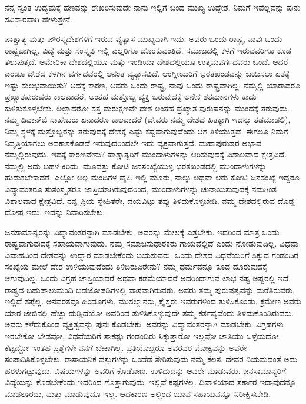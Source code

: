 ನನ್ನ ಸ್ವಂತ ಉದ್ಯಮಕ್ಕೆ ಹಣವನ್ನು ಶೇಖರಿಸುವುದೇ ನಾನು ಇಲ್ಲಿಗೆ ಬಂದ ಮುಖ್ಯ ಉದ್ದೇಶ. ನಿಮಗೆ ಇವೆಲ್ಲವನ್ನು ಪುನಃ ಸವಿಸ್ತಾರವಾಗಿ ಹೇಳುತ್ತೇನೆ.

ಪಾಶ್ಚಾತ್ಯ ಮತ್ತು ಪೌರಸ್ತ್ಯದೇಶಗಳಿಗೆ ಇರುವ ವ್ಯತ್ಯಾಸ ಮುಖ್ಯವಾಗಿ ಇದು. ಅವರು ಒಂದು ರಾಷ್ಟ್ರ, ನಾವು ಒಂದು ರಾಷ್ಟ್ರವಾಗಿಲ್ಲ. ವಿದ್ಯೆ ಮತ್ತು ಸಂಸ್ಕೃತಿ ಇಲ್ಲಿ ಎಲ್ಲರಿಗೂ ದೊರಕುವಂತಿದೆ. ಸಮಾಜದಲ್ಲಿ ಕೆಳಗೆ ಇರುವವರಿಗೂ ಕೂಡ ತಲುಪುತ್ತದೆ. ಅಮೇರಿಕಾ ದೇಶದಲ್ಲಿಯೂ ಮತ್ತು ಇಂಡಿಯಾ ದೇಶದಲ್ಲಿಯೂ ಉತ್ತಮವರ್ಗದವರು ಒಂದೆ. ಆದರೆ ಎರಡೂ ದೇಶದ ಕೆಳಗಿನ ವರ್ಗದವರಲ್ಲಿ ಅನಂತ ವ್ಯತ್ಯಾಸವಿದೆ. ಆಂಗ್ಲೀಯರಿಗೆ ಭರತಖಂಡವನ್ನು ಜಯಿಸಲು ಏತಕ್ಕೆ ಇಷ್ಟು ಸುಲಭವಾಯಿತು? ಅದಕ್ಕೆ ಕಾರಣ, ಅವರು ಒಂದು ರಾಷ್ಟ್ರ, ನಾವು ಒಂದು ರಾಷ್ಟ್ರವಾಗಿಲ್ಲ. ನಮ್ಮಲ್ಲಿ ಯಾರಾದರೂ ಪ್ರಖ್ಯಾತಪುರುಷರು ಕಾಲವಾದರೆ, ಅಂತಹ ಮತ್ತೊಬ್ಬ ವ್ಯಕ್ತಿ ಬರುವುದಕ್ಕೆ ಅನೇಕ ಶತಮಾನಗಳು ಕಾದು ಕುಳಿತುಕೊಳ್ಳಬೇಕು. ಅಲ್ಲಾದರೋ ಸತ್ತ ಮರುಕ್ಷಣವೇ ದೇಶ ಅಂತಹ ಪ್ರಖ್ಯಾತ ಪುರುಷನನ್ನು ಮುಂದಕ್ಕೆ ತರುವುದು. ನಮ್ಮ ದಿವಾನ್‌ಜಿ ಸಾಹೇಬರು ಏನಾದರೂ ಕಾಲವಾದರೆ (ದೇವರು ನಮ್ಮ ದೇಶದ ಹಿತಕ್ಕಾಗಿ ಇದನ್ನು ತಡಮಾಡಲಿ), ನಿಮ್ಮ ಸ್ಥಳಕ್ಕೆ ಮತ್ತೊಬ್ಬರನ್ನು ತರುವುದಕ್ಕೆ ದೇಶಕ್ಕೆ ಎಷ್ಟು ಕಷ್ಟವಾಗುವುದೆಂದು ಆಗ ತಿಳಿಯುತ್ತದೆ. ಈಗಲೂ ನಿಮಗೆ ನಿವೃತ್ತಿಯಾಗಲು ಅವಕಾಶಕೊಡದೆ ಇರುವುದರಿಂದಲೇ ಇದು ವ್ಯಕ್ತವಾಗುತ್ತದೆ. ಮಹಾಪುರುಷರ ಅಭಾವ ನಮ್ಮಲ್ಲಿರುವುದು. ಇದಕ್ಕೆ ಕಾರಣವೇನು? ಪಾಶ್ಚಾತ್ಯರಿಗೆ ಮುಂದಾಳುಗಳನ್ನು ಆರಿಸುವುದಕ್ಕೆ ವಿಶಾಲವಾದ ಕ್ಷೇತ್ರವಿದೆ. ನಮ್ಮಲ್ಲಿ ಅದು ಬಹಳ ಕಿರಿದು. ಮೂವತ್ತು ಕೋಟಿ ಜನಸಂಖ್ಯೆಯುಳ್ಳ ಭರತಖಂಡದಲ್ಲಿ ಮುಂದಾಳುಗಳನ್ನು ಹುಡುಕಬೇಕಾದರೆ, ಎಲ್ಲೋ ಅಲ್ಪ ಮಂದಿಗಳ ಪೈಕಿ. ಇಲ್ಲಿ ಮೂರು, ನಾಲ್ಕು ಅಥವಾ ಆರು ಕೋಟಿ ಜನಸಂಖ್ಯೆ ಇದ್ದರೂ ವಿದ್ಯಾವಂತರೂ ಸುಸಂಸ್ಕೃತರೂ ಜಾಸ್ತಿಯಾಗಿರುವುದರಿಂದ, ಮುಂದಾಳುಗಳನ್ನು ಚುನಾಯಿಸುವುದಕ್ಕೆ ನಮಗಿಂತ ವಿಶಾಲವಾದ ಕ್ಷೇತ್ರವಿದೆ. ನನ್ನ ಪ್ರಿಯ ಸ್ನೇಹಿತರೇ, ದಯವಿಟ್ಟು ತಪ್ಪು ತಿಳಿದುಕೊಳ್ಳಬೇಡಿ. ನಮ್ಮ ದೇಶದಲ್ಲಿರುವ ದೊಡ್ಡ ದೋಷ ಇದು. ಇದನ್ನು ನಿವಾರಿಸಬೇಕು.

ಜನಸಾಮಾನ್ಯರನ್ನು ವಿದ್ಯಾವಂತರನ್ನಾಗಿ ಮಾಡಬೇಕು. ಅವರನ್ನು ಮೇಲಕ್ಕೆ ಎತ್ತಬೇಕು. ಇದರಿಂದ ಮಾತ್ರ ಒಂದು ರಾಷ್ಟ್ರವಾಗುವುದಕ್ಕೆ ಸಹಾಯವಾಗುವುದು. ನಮ್ಮ ಸಮಾಜಸುಧಾರಕರು ಗಾಯವೆಲ್ಲಿದೆ ಎಂದು ನೋಡುವುದಿಲ್ಲ. ವಿಧವಾ ವಿವಾಹದಿಂದ ದೇಶವನ್ನು ಉದ್ದಾರ ಮಾಡಬೇಕೆಂದು ಬಯಸುವರು. ಒಂದು ದೇಶದ ವಿಧವೆಯರಿಗೆ ಸಿಕ್ಕುವ ಗಂಡಂದಿರ ಸಂಖ್ಯೆಯ ಮೇಲೆ ದೇಶ ಉಳಿಯುವುದೆಂದು ತಿಳಿದಿರುವಿರೇನು? ನಮ್ಮ ಧರ್ಮವನ್ನೂ ಕೂಡ ದೂರುವುದಕ್ಕೆ ಆಗುವುದಿಲ್ಲ. ಒಂದು ವಿಗ್ರಹ ಜಾಸ್ತಿಯಾದರೆ ಅಥವಾ ಕಡಮೆಯಾದರೆ ಅದರಿಂದಾಗುವ ಲಾಭ ನಷ್ಟ ಅಷ್ಟರಲ್ಲಿ ಇದೆ. ರಾಷ್ಟ್ರದ ಬಹುಪಾಲುಮಂದಿ ಬಡಜೋಪಡಿಗಳಲ್ಲಿ ವಾಸವಾಗಿರುವರು. ಅವರು ತಮ್ಮ ಪುರುಷತ್ವವನ್ನು ಮರೆತಿರುವರು. ಇಲ್ಲಿದೆ ತಪ್ಪೆಲ್ಲ. ಅನವರತವೂ ಹಿಂದೂಗಳು, ಮುಸಲ್ಮಾನರು, ಕ್ರೈಸ್ತರು ಇವರುಗಳಿಂದ ತುಳಿಸಿಕೊಂಡು, ಕ್ರಮೇಣ ಅವರು ಯಾರ ಜೇಬಿನಲ್ಲಿ ಹೆಚ್ಚು ದುಡ್ಡಿದೆಯೋ ಅವರಿಂದ ತುಳಿಸಿಕೊಳ್ಳುವುದೇ ತಮ್ಮ ಕರ್ತವ್ಯವೆಂದು ತಿಳಿದುಕೊಂಡಿರುವರು. ಅವರು ಕಳೆದುಕೊಂಡ ವ್ಯಕ್ತಿತ್ವವನ್ನು ಪುನಃ ಕೊಡಬೇಕು. ಅವರನ್ನು ವಿದ್ಯಾವಂತರನ್ನಾಗಿ ಮಾಡಬೇಕು. ವಿಗ್ರಹಗಳು ಇರಬೇಕೋ ಬೇಡವೋ, ವಿಧವೆಯರಿಗೆ ಸಾಕಷ್ಟು ಗಂಡಂದಿರು ಸಿಕ್ಕುತ್ತಾರೋ ಇಲ್ಲವೋ ಜಾತಿಯು ಒಳ್ಳೆಯದೋ ಕೆಟ್ಟದ್ದೋ ಇಂತಹ ಪ್ರಶ್ನೆಗಳೇ ನನಗೆ ಬೇಕಾಗಿಲ್ಲ. ಪ್ರತಿಯೊಬ್ಬರೂ ಅವರವರ ಮೋಕ್ಷವನ್ನು ಅವರೇ ಸಂಪಾದಿಸಿಕೊಳ್ಳಬೇಕು. ರಾಸಾಯನಿಕ ವಸ್ತುಗಳನ್ನು ಒಂದೆಡೆ ಸೇರಿಸುವುದು ನಮ್ಮ ಕೆಲಸ. ದೇವರ ನಿಯಮದಂತೆ ಅದು ಹರಳುಗಟ್ಟುವುದು. ವಿಷಯಗಳನ್ನು ಅವರಿಗೆ ಕೊಡೋಣ. ಉಳಿದುದನ್ನು ಅವರೇ ಮಾಡುವರು. ಜನಸಾಮಾನ್ಯರಿಗೆ ವಿದ್ಯೆಯನ್ನು ಕೊಡಬೇಕೆಂದು ಇದರಿಂದ ಗೊತ್ತಾಗುವುದು. ಇಲ್ಲಿವೆ ಕಷ್ಟಗಳೆಲ್ಲ. ದಿವಾಳಿಯಾದ ಸರ್ಕಾರ ಇದಾವುದನ್ನೂ ಮಾಡಲಾರದು, ಮತ್ತು ಮಾಡುವುದೂ ಇಲ್ಲ. ಆದಕಾರಣ ಅಲ್ಲಿಂದ ಯಾವ ಸಹಾಯವನ್ನೂ ನಿರೀಕ್ಷಿಸಬೇಡಿ.


